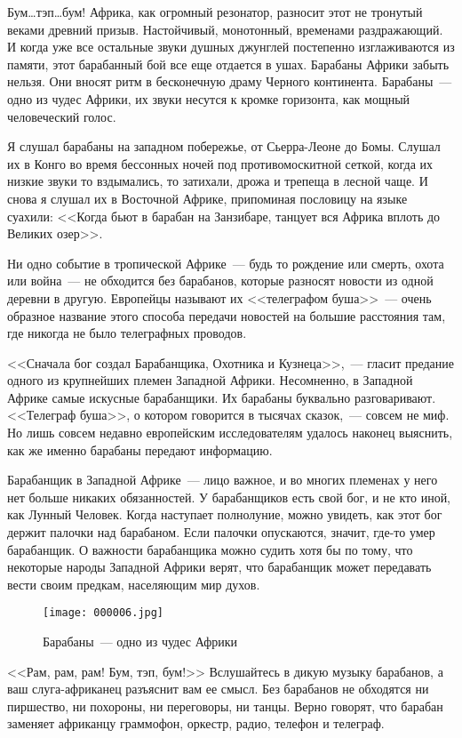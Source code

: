 \documentclass[12pt,a4paper,twoside,openany,svgnames]{memoir}
\begin{document}
Бум\ldots тэп\ldots бум! Африка, как огромный резонатор, разносит этот не тронутый веками древний призыв. Настойчивый, монотонный, временами раздражающий. И когда уже все остальные звуки душных джунглей постепенно изглаживаются из памяти, этот барабанный бой все еще отдается в ушах. Барабаны Африки забыть нельзя. Они вносят ритм в бесконечную драму Черного континента. Барабаны~--- одно из чудес Африки, их звуки несутся к кромке горизонта, как мощный человеческий голос.

Я слушал барабаны на западном побережье, от Сьерра-Леоне до Бомы. Слушал их в Конго во время бессонных ночей под противомоскитной сеткой, когда их низкие звуки то вздымались, то затихали, дрожа и трепеща в лесной чаще. И снова я слушал их в Восточной Африке, припоминая пословицу на языке суахили: <<Когда бьют в барабан на Занзибаре, танцует вся Африка вплоть до Великих озер>>.

Ни одно событие в тропической Африке~--- будь то рождение или смерть, охота или война~--- не обходится без барабанов, которые разносят новости из одной деревни в другую. Европейцы называют их <<телеграфом буша>>~--- очень образное название этого способа передачи новостей на большие расстояния там, где никогда не было телеграфных проводов.

<<Сначала бог создал Барабанщика, Охотника и Кузнеца>>,~--- гласит предание одного из крупнейших племен Западной Африки. Несомненно, в Западной Африке самые искусные барабанщики. Их барабаны буквально разговаривают. <<Телеграф буша>>, о котором говорится в тысячах сказок,~--- совсем не миф. Но лишь совсем недавно европейским исследователям удалось наконец выяснить, как же именно барабаны передают информацию.

Барабанщик в Западной Африке~--- лицо важное, и во многих племенах у него нет больше никаких обязанностей. У барабанщиков есть свой бог, и не кто иной, как Лунный Человек. Когда наступает полнолуние, можно увидеть, как этот бог держит палочки над барабаном. Если палочки опускаются, значит, где-то умер барабанщик. О важности барабанщика можно судить хотя бы по тому, что некоторые народы Западной Африки верят, что барабанщик может передавать вести своим предкам, населяющим мир духов.

\begin{figure}[ht!]
\centering
\texttt{[image: 000006.jpg]}
\caption{Барабаны~--- одно из чудес Африки}
\label{overflow}
\end{figure}


<<Рам, рам, рам! Бум, тэп, бум!>> Вслушайтесь в дикую музыку барабанов, а ваш слуга-африканец разъяснит вам ее смысл. Без барабанов не обходятся ни пиршество, ни похороны, ни переговоры, ни танцы. Верно говорят, что барабан заменяет африканцу граммофон, оркестр, радио, телефон и телеграф.
\end{document}
